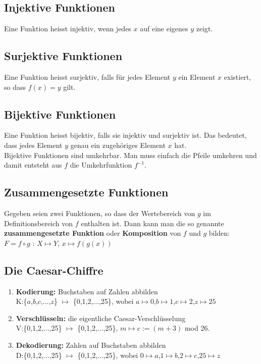 \documentclass[12pt]{scrartcl}
\begin{document}
\subsection{Injektive Funktionen}
Eine Funktion heisst injektiv, wenn jedes $x$ auf eine eigenes $y$ zeigt.

\subsection{Surjektive Funktionen}
Eine Funktion heisst surjektiv, falls für jedes Element $y$ ein Element $x$ existiert, so dass $f(x) = y$ gilt.

\subsection{Bijektive Funktionen}
Eine Funktion heisst bijektiv, falls sie injektiv und surjektiv ist. Das bedeutet, dass jedes Element $y$ genau
ein zugehöriges Element $x$ hat.\\

Bijektive Funktionen sind umkehrbar. Man muss einfach die Pfeile umkehren und damit entsteht
aus $f$ die Umkehrfunktion $f^{-1}$.


\subsection{Zusammengesetzte Funktionen}
Gegeben seien zwei Funktionen, so dass der Wertebereich von $g$ im Definitionsbereich von $f$ enthalten ist.
Dann kann man die so genannte \textbf{zusammengesetzte Funktion} oder \textbf{Komposition} von $f$
und $g$ bilden:\\
$F = f \circ g$ : $X \longmapsto Y$, $x \longmapsto f(g(x))$


\subsection{Die Caesar-Chiffre}
\begin{enumerate}
    \item \textbf{Kodierung:} Buchstaben auf Zahlen abbilden\\
    K:\{$a$,$b$,$c$,...,$z$\} $\mapsto$ \{0,1,2,...,25\}, wobei $a \mapsto 0$,$b \mapsto 1$,$c \mapsto 2$,$z \mapsto 25$
    \item \textbf{Verschlüsseln:} die eigentliche Caesar-Verschlüsselung\\
    V:\{0,1,2,...,25\} $\mapsto$ \{0,1,2,...,25\}, $m \mapsto c := (m + 3)$ mod 26.
    \item \textbf{Dekodierung:} Zahlen auf Buchstaben abbilden\\
    D:\{0,1,2,...,25\} $\mapsto$ \{0,1,2,...,25\}, wobei $0 \mapsto a$,$1 \mapsto b$,$2 \mapsto c$,$25 \mapsto z$
\end{enumerate}
\end{document}
